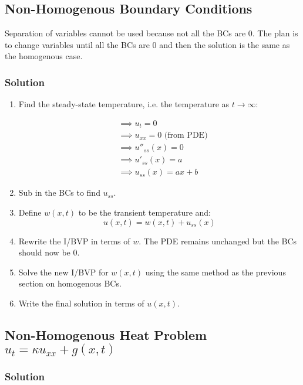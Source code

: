 \documentclass[11pt]{article}
\begin{document}
\subsection{Non-Homogenous Boundary Conditions}

Separation of variables cannot be used because not all the BCs are 0. The plan is to change variables until all the BCs are 0 and then the solution is the same as the homogenous case.

\subsubsection*{Solution}

\begin{enumerate}

\item Find the steady-state temperature, i.e. the temperature as $t \to \infty$:

\begin{align*}
&\implies u_t = 0 \\
&\implies u_{xx} = 0 \text{  (from PDE)} \\
&\implies u''_{ss}(x) = 0 \\
&\implies u'_{ss}(x) = a \\
&\implies u_{ss}(x) = ax+b
\end{align*}

\item Sub in the BCs to find $u_{ss}$.

\item Define $w(x,t)$ to be the transient temperature and:
$$ u(x,t) = w(x,t) + u_{ss}(x) $$

\item Rewrite the I/BVP in terms of $w$. The PDE remains unchanged but the BCs should now be 0.
\item Solve the new I/BVP for $w(x,t)$ using the same method as the previous section on homogenous BCs.
\item Write the final solution in terms of $u(x,t)$.

\end{enumerate}

\subsection{Non-Homogenous Heat Problem $u_t = \kappa u_{xx} + g(x,t)$}

\subsubsection*{Solution}
\end{document}
